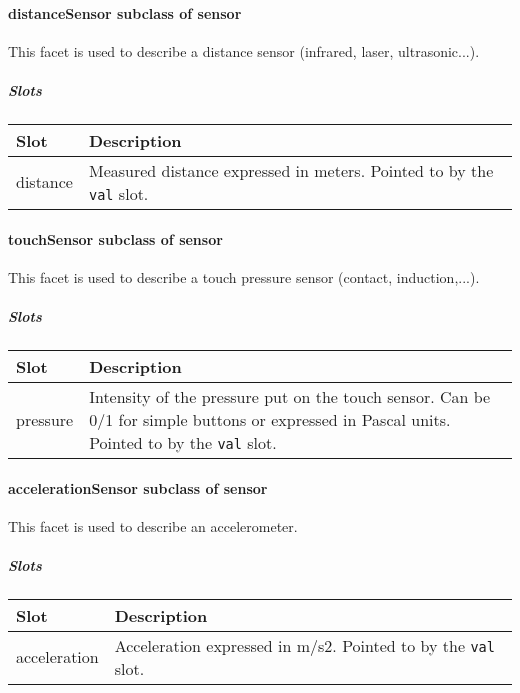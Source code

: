 \documentclass[a4paper]{article}
\begin{document}
\paragraph{ distanceSensor  \textmd{subclass of sensor}}

{\sffamily
This facet is used to describe a distance sensor (infrared, laser,
ultrasonic...).}

\subparagraph{Slots}

\begin{flushleft}
\tablehead{}
\begin{supertabular}{|m{2.8669999cm}|m{12.422cm}|}
\hline
\sffamily\bfseries Slot &
\sffamily\bfseries Description\\\hline
distance &
\sffamily Measured distance expressed in meters.
Pointed to by the \texttt{val} slot.\\\hline
\end{supertabular}
\end{flushleft}
\paragraph{ touchSensor  \textmd{subclass of sensor}}

{\sffamily
This facet is used to describe a touch pressure sensor (contact,
induction,...).}

\subparagraph{Slots}

\begin{flushleft}
\tablehead{}
\begin{supertabular}{|m{2.8669999cm}|m{12.422cm}|}
\hline
\sffamily\bfseries Slot &
\sffamily\bfseries Description\\\hline
pressure &
\sffamily Intensity of the pressure put on the
touch sensor. Can be 0/1 for simple buttons or expressed in Pascal
units. Pointed to by the \texttt{val} slot.\\\hline
\end{supertabular}
\end{flushleft}
\paragraph{ accelerationSensor  \textmd{subclass of sensor}}

{\sffamily
This facet is used to describe an accelerometer.}

\subparagraph{Slots}

\begin{flushleft}
\tablehead{}
\begin{supertabular}{|m{3.651cm}|m{11.639cm}|}
\hline
\sffamily\bfseries Slot &
\sffamily\bfseries Description\\\hline
acceleration &
\sffamily Acceleration expressed in m/s2.
Pointed to by the \texttt{val} slot.\\\hline
\end{supertabular}
\end{flushleft}
\end{document}
